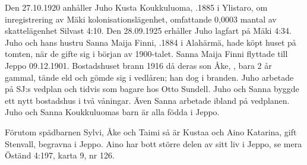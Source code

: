 %
Den 27.10.1920 anhåller Juho Kusta Koukkuluoma, .1885 i Ylistaro, om inregistrering av Mäki kolonisationslägenhet, omfattande 0,0003 mantal av skattelägenhet Silvast 4:10. Den 28.09.1925 erhåller Juho lagfart på Mäki 4:34. Juho och hans hustru Sanna Maija Finni, .1884 i Alahärmä, hade köpt huset på tomten, när de gifte sig i början av 1900-talet. Sanna Maija Finni flyttade till Jeppo 09.12.1901.	Bostadshuset brann 1916 då deras son Åke, , bara 2 år gammal, tände eld och 	gömde sig i vedlåren; han dog i branden. Juho arbetade på SJ:s vedplan och tidvis som bagare hos Otto Sundell. Juho och Sanna byggde	ett nytt bostadshus i två våningar. Även Sanna arbetade ibland på vedplanen. Juho och Sanna Koukkuluomas barn är alla födda i Jeppo.
\begin{jhchildren}
  \item {}
  \item {}
  \item {}
  \item {}
  \item {}
  \item {}
  \item {}
  \item {}
  \item {}
  \item {}
\end{jhchildren}

Förutom spädbarnen Sylvi, Åke och Taimi så är Kustaa och Aino	Katarina, gift Stenvall, begravna i Jeppo. Aino har bott större delen av sitt liv i Jeppo, se mera Öständ 4:197, karta 9, nr 126.

